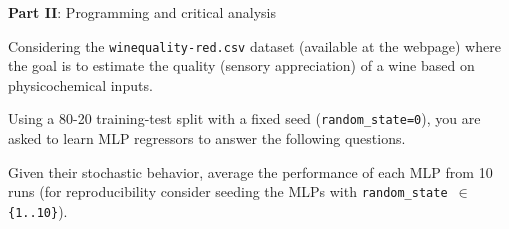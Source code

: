 \documentclass[12pt]{article}
\begin{document}
\vskip 0.5cm

\begin{center}
\large{\textbf{Part II}: Programming and critical analysis}\normalsize
\end{center}

\noindent Considering the \texttt{winequality-red.csv} dataset (available at the webpage) where the goal is  to estimate the quality (sensory appreciation)
of a wine based on physicochemical inputs.

\vskip 0.2cm

\noindent Using a 80-20 training-test split with a fixed seed (\texttt{random\_state=0}), you are asked to learn MLP
regressors to answer the following questions.

\vskip 0.2cm

\noindent Given their stochastic behavior, average the performance of each MLP from 10 runs (for reproducibility consider seeding the MLPs with
\texttt{random\_state $\in$ \{1..10\}}).
\end{document}
